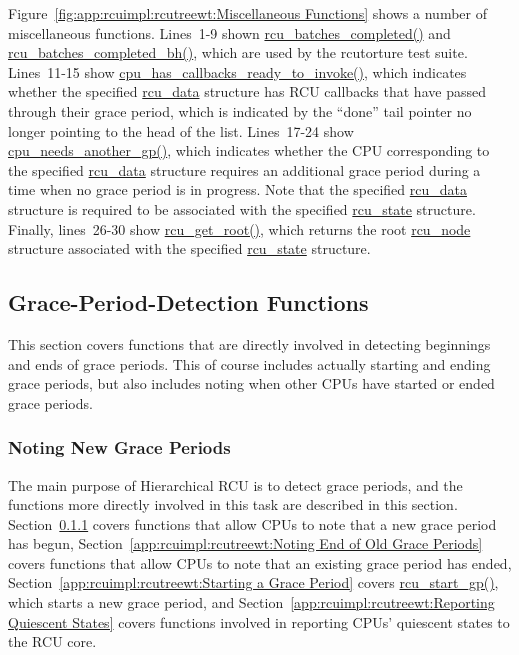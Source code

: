 Figure~\ref{fig:app:rcuimpl:rcutreewt:Miscellaneous Functions}
shows a number of miscellaneous functions.
Lines~1-9 shown \url{rcu_batches_completed()} and
\url{rcu_batches_completed_bh()}, which are used by the rcutorture
test suite.
Lines~11-15 show \url{cpu_has_callbacks_ready_to_invoke()}, which
indicates whether the specified \url{rcu_data} structure has RCU
callbacks that have passed through their grace period, which
is indicated by the ``done'' tail pointer no longer pointing
to the head of the list.
Lines~17-24 show \url{cpu_needs_another_gp()}, which indicates
whether the CPU corresponding to the specified \url{rcu_data}
structure requires an additional grace period during a time when
no grace period is in progress.
Note that the specified \url{rcu_data} structure is required
to be associated with the specified \url{rcu_state} structure.
Finally, lines~26-30 show \url{rcu_get_root()}, which returns
the root \url{rcu_node} structure associated with the specified
\url{rcu_state} structure.

\subsection{Grace-Period-Detection Functions}
\label{app:rcuimpl:rcutreewt:Grace-Period-Detection Functions}

This section covers functions that are directly involved in detecting
beginnings and ends of grace periods.
This of course includes actually starting and ending grace periods,
but also includes noting when other CPUs have started or ended
grace periods.

\subsubsection{Noting New Grace Periods}
\label{app:rcuimpl:rcutreewt:Noting New Grace Periods}

The main purpose of Hierarchical RCU is to detect grace periods,
and the functions more directly involved in this task are described
in this section.
Section~\ref{app:rcuimpl:rcutreewt:Noting New Grace Periods}
covers functions that allow CPUs to note that a new grace period has
begun,
Section~\ref{app:rcuimpl:rcutreewt:Noting End of Old Grace Periods}
covers functions that allow CPUs to note that an existing grace period
has ended,
Section~\ref{app:rcuimpl:rcutreewt:Starting a Grace Period}
covers \url{rcu_start_gp()}, which starts a new grace period, and
Section~\ref{app:rcuimpl:rcutreewt:Reporting Quiescent States}
covers functions involved in reporting CPUs' quiescent states to
the RCU core.

